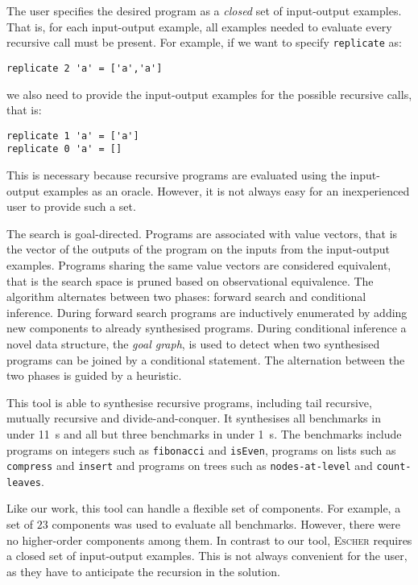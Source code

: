 The user specifies the desired program as a \emph{closed} set of input-output examples. That is, for each input-output example, all examples needed to evaluate every recursive call must be present. For example, if we want to specify \lstinline!replicate! as:
\begin{lstlisting}[style=plain]
replicate 2 'a' = ['a','a']
\end{lstlisting}
we also need to provide the input-output examples for the possible recursive calls, that is:
\begin{lstlisting}[style=plain]
replicate 1 'a' = ['a']
replicate 0 'a' = []
\end{lstlisting}
This is necessary because recursive programs are evaluated using the input-output examples as an oracle. However, it is not always easy for an inexperienced user to provide such a set.

The search is goal-directed. Programs are associated with value vectors, that is the vector of the outputs of the program on the inputs from the input-output examples. Programs sharing the same value vectors are considered equivalent, that is the search space is pruned based on observational equivalence.
The algorithm alternates between two phases: forward search and conditional inference. During forward search programs are inductively enumerated by adding new components to already synthesised programs. During conditional inference a novel data structure, the \emph{goal graph}, is used to detect when two synthesised programs can be joined by a conditional statement. The alternation between the two phases is guided by a heuristic.

This tool is able to synthesise recursive programs, including tail recursive, mutually recursive and divide-and-conquer. It synthesises all benchmarks in under \SI{11}{s} and all but three benchmarks in under \SI{1}{s}. The benchmarks include programs on integers such as \lstinline!fibonacci! and \lstinline!isEven!, programs on lists such as \lstinline!compress! and \lstinline!insert! and programs on trees such as \lstinline!nodes-at-level! and \lstinline!count-leaves!.

Like our work, this tool can handle a flexible set of components. For example, a set of $23$ components was used to evaluate all benchmarks. However, there were no higher-order components among them. In contrast to our tool, \textsc{Escher} requires a closed set of input-output examples. This is not always convenient for the user, as they have to anticipate the recursion in the solution.

